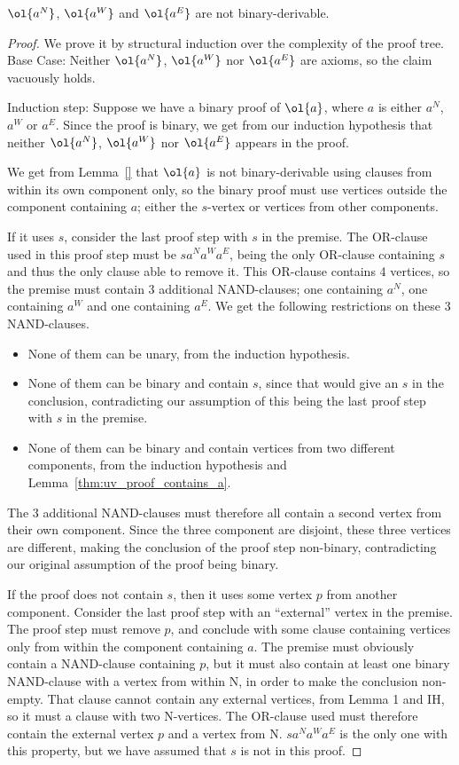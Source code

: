 \begin{lemma}
  $\ol{a^N}$, $\ol{a^W}$ and $\ol{a^E}$ are not binary-derivable.
  \label{thm:non_binary_derivable_a}
\end{lemma}

\begin{proof}
  We prove it by structural induction over the complexity of the proof tree.
  Base Case:
  Neither $\ol{a^N}$, $\ol{a^W}$ nor $\ol{a^E}$ are axioms, so the claim vacuously holds.

  Induction step:
  Suppose we have a binary proof of $\ol{a}$, where $a$ is either $a^N$, $a^W$ or $a^E$.
  Since the proof is binary, we get from our induction hypothesis that neither $\ol{a^N}$, $\ol{a^W}$ nor $\ol{a^E}$ appears in the proof.

  We get from Lemma~\ref{} that $\ol{a}$ is not binary-derivable using clauses from within its own component only, so the binary proof must use vertices outside the component containing $a$; either the $s$-vertex or vertices from other components.

  If it uses $s$, consider the last proof step with $s$ in the premise.
  The OR-clause used in this proof step must be $sa^Na^Wa^E$, being the only OR-clause containing $s$ and thus the only clause able to remove it.
  This OR-clause contains 4 vertices, so the premise must contain 3 additional NAND-clauses;
  one containing $a^N$, one containing $a^W$ and one containing $a^E$.
  We get the following restrictions on these 3 NAND-clauses.
  \begin{itemize}
    \item None of them can be unary, from the induction hypothesis.
    \item None of them can be binary and contain $s$, since that would give an $s$ in the conclusion, contradicting our assumption of this being the last proof step with $s$ in the premise.
    \item None of them can be binary and contain vertices from two different components, from the induction hypothesis and Lemma~\ref{thm:uv_proof_contains_a}.
  \end{itemize}
  The 3 additional NAND-clauses must therefore all contain a second vertex from their own component.
  Since the three component are disjoint, these three vertices are different, making the conclusion of the proof step non-binary, contradicting our original assumption of the proof being binary.

  If the proof does not contain $s$, then it uses some vertex $p$ from another component.
  Consider the last proof step with an ``external'' vertex in the premise.
  The proof step must remove $p$, and conclude with some clause containing vertices only from within the component containing $a$.
  The premise must obviously contain a NAND-clause containing $p$, but it must also contain at least one binary NAND-clause with a vertex from within N, in order to make the conclusion non-empty.
  That clause cannot contain any external vertices, from Lemma 1 and IH, so it must a clause with two N-vertices.
  The OR-clause used must therefore contain the external vertex $p$ and a vertex from N.
  $sa^Na^Wa^E$ is the only one with this property, but we have assumed that $s$ is not in this proof.


\end{proof}
